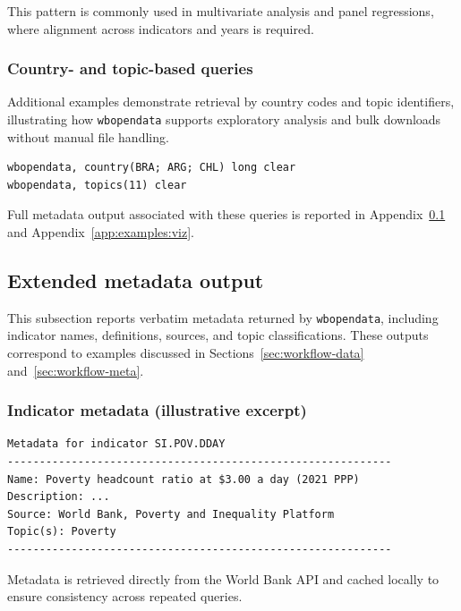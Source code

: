 \documentclass[bib]{statapress}
\begin{document}
This pattern is commonly used in multivariate analysis and panel regressions,
where alignment across indicators and years is required.

\subsubsection{Country- and topic-based queries}
Additional examples demonstrate retrieval by country codes and topic identifiers,
illustrating how \texttt{wbopendata} supports exploratory analysis and bulk downloads
without manual file handling.

\begin{verbatim}
wbopendata, country(BRA; ARG; CHL) long clear
wbopendata, topics(11) clear
\end{verbatim}

Full metadata output associated with these queries is reported in
Appendix~\ref{app:examples:metadata} and Appendix~\ref{app:examples:viz}.

\subsection{Extended metadata output}\label{app:examples:metadata}

This subsection reports verbatim metadata returned by \texttt{wbopendata},
including indicator names, definitions, sources, and topic classifications.
These outputs correspond to examples discussed in Sections~\ref{sec:workflow-data} and~\ref{sec:workflow-meta}.

\subsubsection{Indicator metadata (illustrative excerpt)}
\begin{verbatim}
Metadata for indicator SI.POV.DDAY
------------------------------------------------------------
Name: Poverty headcount ratio at $3.00 a day (2021 PPP)
Description: ...
Source: World Bank, Poverty and Inequality Platform
Topic(s): Poverty
------------------------------------------------------------
\end{verbatim}

Metadata is retrieved directly from the World Bank API and cached locally to
ensure consistency across repeated queries.
\end{document}
